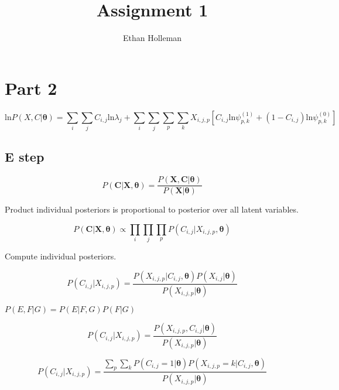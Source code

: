 \documentclass[12pt]{article}
\theoremstyle{definition}
\begin{document}
\title{
	Assignment 1}

\author{Ethan Holleman}
\maketitle

\section{Part 2}


\begin{equation}
	\textrm{ln}P(X, C | \boldsymbol{\theta}) = \sum_{i} \sum_{j} C_{i, j} \textrm{ln}\lambda_{j} + \sum_{i}\sum_{j}\sum_{p}\sum_{k} X_{i,j,p}[C_{i,j}\textrm{ln} \psi^{(1)}_{p, k} + (1 - C_{i,j})\textrm{ln}\psi^{(0)}_{p, k}]
\end{equation}

\subsection{E step}


\begin{equation}
	P(\boldsymbol{C} | \boldsymbol{X}, \boldsymbol{\theta}) = \frac{P(\boldsymbol{X}, \boldsymbol{C} | \boldsymbol{\theta})}{P(\boldsymbol{X} | \boldsymbol{\theta})}
\end{equation}

Product individual posteriors is proportional to posterior over all latent variables.

\begin{equation}
P(\boldsymbol{C} | \boldsymbol{X}, \boldsymbol{\theta}) \propto
 \prod_{i} \prod_{j} \prod_{p}P(C_{i, j} | X_{i, j, p}, \boldsymbol{\theta})
\end{equation}

Compute individual posteriors.

\begin{equation}
	P(C_{i, j} | X_{i, j, p}) = \frac{P(X_{i,j,p} | C_{i,j}, \boldsymbol{\theta}) P(X_{i, j} | \boldsymbol{\theta})}{P(X_{i,j,p} | \boldsymbol{\theta})}
\end{equation}

$P(E, F | G) = P(E | F, G) P(F | G)$

\begin{equation}
P(C_{i, j} | X_{i, j, p}) = \frac{P(X_{i,j,p}, C_{i, j} | \boldsymbol{\theta})}{P(X_{i,j,p} | \boldsymbol{\theta})}
\end{equation}

\begin{equation}
P(C_{i, j} | X_{i, j, p}) = \frac{ \sum_{p} \sum_{k} P(C_{i, j} = 1 | \boldsymbol{\theta})P(X_{i, j, p} = k | C_{i, j}, \boldsymbol{\theta})}{P(X_{i,j,p} | \boldsymbol{\theta})}
\end{equation}
\end{document}
